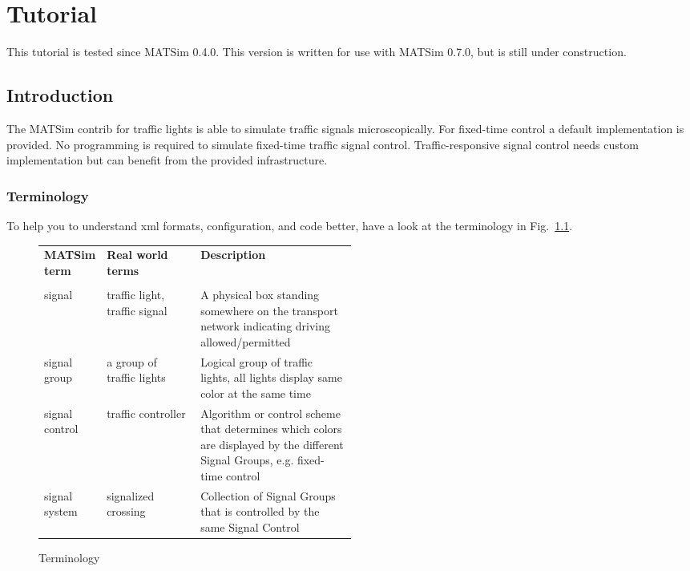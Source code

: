 \chapter{Tutorial}

This tutorial is tested since MATSim 0.4.0. This version is written for use with MATSim 0.7.0, but is still under construction. 

\section{Introduction}

The MATSim contrib for traffic lights is able to simulate traffic signals microscopically. 
For fixed-time control a default implementation is provided.  
No programming is required to simulate fixed-time traffic signal control. 
Traffic-responsive signal control needs custom implementation but can benefit from the provided infrastructure. 



\subsection{Terminology}

To help you to understand xml formats, configuration, and code better, have a look at the terminology in Fig.~\ref{fig:signals_terminology}. 

\begin{figure}[!h]
	\centering
\begin{tabularx}{\linewidth}{p{0.2\linewidth}p{0.3\linewidth}X}
	\textbf{MATSim term} & \textbf{Real world terms} & \textbf{Description} \\ 
& &  \\
signal & traffic light, traffic signal & A physical box standing somewhere on the transport network indicating driving allowed/permitted \\ 
signal group & a group of traffic lights & Logical group of traffic lights, all lights display same color at the same time \\ 
signal control & traffic controller & Algorithm or control scheme that determines which colors are displayed by the different Signal Groups, e.g. fixed-time control  \\ 
signal system & signalized crossing &  Collection of Signal Groups that is controlled by the same Signal Control 
\end{tabularx}
	\caption{Terminology}
	\label{fig:signals_terminology}
\end{figure}


